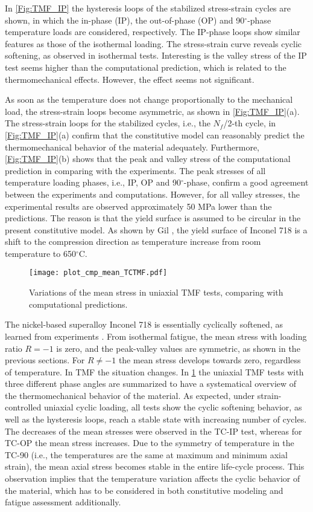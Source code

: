 In \ref{Fig:TMF_IP} the hysteresis loops of the stabilized stress-strain cycles are shown, in which the in-phase (IP), the out-of-phase (OP) and 90$^\circ$-phase temperature loads are considered, respectively.
The IP-phase loops show similar features as those of the isothermal loading.
The stress-strain curve reveals cyclic softening, as observed in isothermal tests. Interesting is the valley stress of the IP test seems higher than the computational prediction, which is related to the thermomechanical effects. However, the effect seems not significant.

As soon as the temperature does not change proportionally to the mechanical load, the stress-strain loops become asymmetric, as shown in \ref{Fig:TMF_IP}(a).
The stress-strain loops for the stabilized cycles, i.e., the $N_f$/2-th cycle, in \ref{Fig:TMF_IP}(a) confirm that the constitutive model can reasonably predict the thermomechanical behavior of the material adequately.
Furthermore, \ref{Fig:TMF_IP}(b) shows that the peak and valley stress of the computational prediction in comparing with the experiments.
The peak stresses of all temperature loading phases, i.e., IP, OP and 90$^\circ$-phase, confirm a good agreement between the experiments and computations.
However, for all valley stresses, the experimental results are observed approximately 50 MPa lower than the predictions.
The reason is that the yield surface is assumed to be circular in the present constitutive model.
As shown by Gil \cite{Gil1998}, the yield surface of Inconel 718 is a shift to the compression direction as temperature increase from room temperature to 650$^\circ$C.

\begin{figure}[!ht]
  \centering
  \texttt{[image: plot\_cmp\_mean\_TCTMF.pdf]}
  \caption{Variations of the mean stress in uniaxial TMF tests, comparing with computational predictions.}
  \label{Fig:plot_cmp_mean_TCTMF}
\end{figure}

The nickel-based superalloy Inconel 718 is essentially cyclically softened, as learned from experiments \cite{Koch85,Morrow88,Socie2000}. From isothermal fatigue, the mean stress with loading ratio $R=-1$ is zero, and the peak-valley values are symmetric, as shown in the previous sections. For $R \ne -1$ the mean stress develops towards zero, regardless of temperature. In TMF the situation changes. In \ref{Fig:plot_cmp_mean_TCTMF} the uniaxial TMF tests with three different phase angles are summarized to have a systematical overview of the thermomechanical behavior of the material. As expected, under strain-controlled uniaxial cyclic loading, all tests show the cyclic softening behavior, as well as the hysteresis loops, reach a stable state with increasing number of cycles. The decreases of the mean stresses were observed in the TC-IP test, whereas for TC-OP the mean stress increases. Due to the symmetry of temperature in the TC-90 (i.e., the temperatures are the same at maximum and minimum axial strain), the mean axial stress becomes stable in the entire life-cycle process. This observation implies that the temperature variation affects the cyclic behavior of the material, which has to be considered in both constitutive modeling and fatigue assessment additionally.

